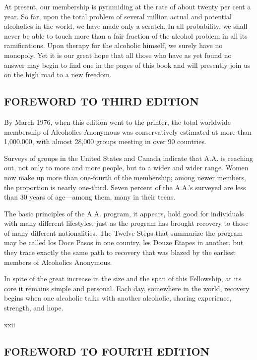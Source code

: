 At present, our membership is pyramiding at the rate of about twenty per cent a year.
So far, upon the
total problem of several million actual and potential alcoholics in the world, we have made only a scratch.
In all probability, we shall never be able to touch more than a fair fraction of the alcohol problem in all its ramiﬁcations.
Upon therapy for the alcoholic himself, we surely have no monopoly. 
Yet it is our great hope that all those who have as yet found no answer may begin to find one in the pages of this book and will presently join us on the high road to a new freedom.



\subsection{FOREWORD TO THIRD EDITION}

By March 1976, when this edition went to the printer, the total worldwide membership of Alcoholics Anonymous was conservatively estimated at more than 1,000,000, with almost 28,000 groups meeting in over 90 countries.

Surveys of groups in the United States and Canada indicate that A.A. is reaching out, not only to more and more people, but to a wider and wider range.
Women now make up more than one-fourth of the membership; 
among newer members, the proportion is nearly one-third. 
Seven percent of the A.A.’s surveyed are less than 30 years of age—among them, many in their teens.

The basic principles of the A.A. program, it appears, hold  good  for  individuals  with  many  different lifestyles, just as the program has brought recovery to those of many different nationalities. 
The Twelve Steps that summarize the program may be called los Doce Pasos in one country, les Douze Etapes in another, but they trace exactly the same path to recovery that was blazed by the earliest members of Alcoholics Anonymous.

In spite of the great increase in the size and the span of this Fellowship, at its core it remains simple and personal. Each day, somewhere in the world, recovery begins when one alcoholic talks with another alcoholic, sharing experience, strength, and hope.

xxii


\subsection{FOREWORD TO FOURTH EDITION}

